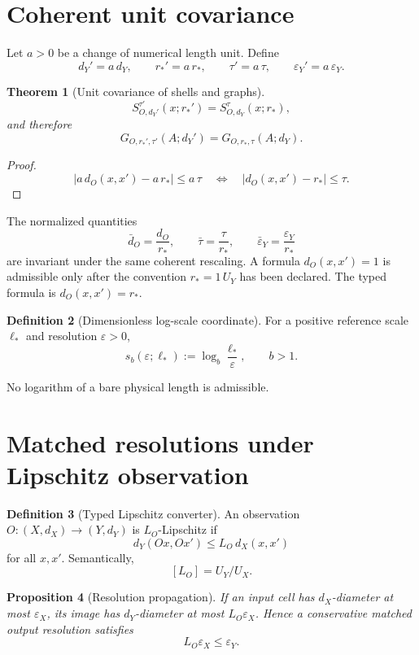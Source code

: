\documentclass[11pt,a4paper]{article}
\theoremstyle{definition}
\newtheorem{definition}{Definition}[section]
\theoremstyle{plain}
\newtheorem{theorem}[definition]{Theorem}
\newtheorem{proposition}[definition]{Proposition}
\theoremstyle{remark}
\newcommand{\abs}[1]{\left\lvert #1\right\rvert}
\begin{document}
\section{Coherent unit covariance}

Let $a>0$ be a change of numerical length unit. Define
\[
 d_Y'=a\,d_Y,\qquad
 r_*'=a\,r_*,\qquad
 \tau'=a\,\tau,\qquad
 \varepsilon_Y'=a\,\varepsilon_Y.
\]

\begin{theorem}[Unit covariance of shells and graphs]
\label{thm:unit}
\[
 S_{O,d_Y'}^{\tau'}(x;r_*')
 =
 S_{O,d_Y}^{\tau}(x;r_*),
\]
and therefore
\[
 G_{O,r_*',\tau'}(A;d_Y')
 =
 G_{O,r_*,\tau}(A;d_Y).
\]
\end{theorem}

\begin{proof}
\[
\abs{a\,d_O(x,x')-a\,r_*}\leq a\,\tau
\quad\Longleftrightarrow\quad
\abs{d_O(x,x')-r_*}\leq\tau.
\]
\end{proof}

The normalized quantities
\[
 \bar d_O=\frac{d_O}{r_*},
 \qquad
 \bar\tau=\frac{\tau}{r_*},
 \qquad
 \bar\varepsilon_Y=\frac{\varepsilon_Y}{r_*}
\]
are invariant under the same coherent rescaling. A formula
$d_O(x,x')=1$ is admissible only after the convention $r_*=1\,U_Y$ has
been declared. The typed formula is $d_O(x,x')=r_*$.

\begin{definition}[Dimensionless log-scale coordinate]
For a positive reference scale $\ell_*$ and resolution $\varepsilon>0$,
\[
 s_b(\varepsilon;\ell_*):=
 \log_b\frac{\ell_*}{\varepsilon},
 \qquad b>1.
\]
\end{definition}

No logarithm of a bare physical length is admissible.

\section{Matched resolutions under Lipschitz observation}

\begin{definition}[Typed Lipschitz converter]
An observation $O:(X,d_X)\to(Y,d_Y)$ is $L_O$-Lipschitz if
\[
 d_Y(Ox,Ox')\leq L_O\,d_X(x,x')
\]
for all $x,x'$. Semantically,
\[
 [L_O]=U_Y/U_X.
\]
\end{definition}

\begin{proposition}[Resolution propagation]
\label{prop:resolution}
If an input cell has $d_X$-diameter at most $\varepsilon_X$, its image has
$d_Y$-diameter at most $L_O\varepsilon_X$. Hence a conservative matched
output resolution satisfies
\[
 L_O\varepsilon_X\leq\varepsilon_Y.
\]
\end{proposition}
\end{document}
